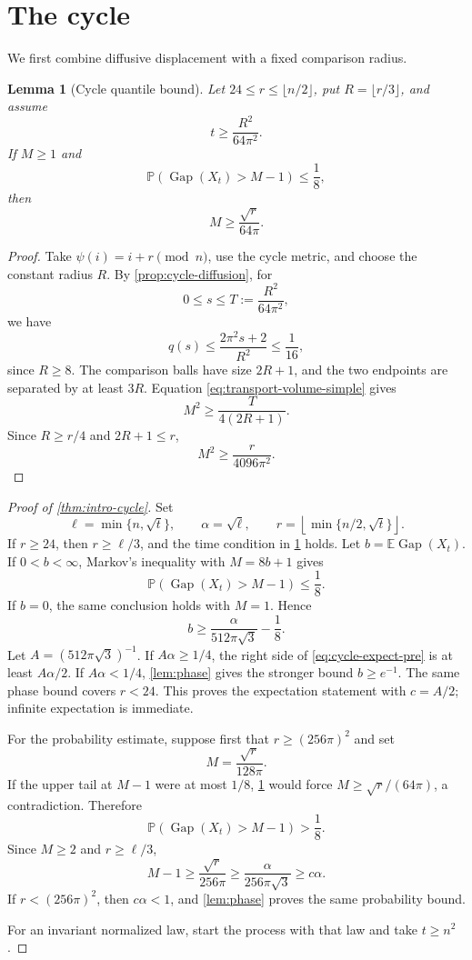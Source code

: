 \documentclass[11pt]{article}
\newtheorem{lemma}[lemma]{Lemma}
\theoremstyle{remark}
\newcommand{\E}{\mathbb{E}}
\newcommand{\Pp}{\mathbb{P}}
\newcommand{\Gap}{\operatorname{Gap}}
\begin{document}
\section{The cycle}\label{sec:cycle}

We first combine diffusive displacement with a fixed comparison radius.

\begin{lemma}[Cycle quantile bound]\label{lem:cycle-quantile}
Let $24\le r\le\lfloor n/2\rfloor$, put $R=\lfloor r/3\rfloor$, and assume
\[
 t\ge\frac{R^2}{64\pi^2}.
\]
If $M\ge1$ and
\[
 \Pp(\Gap(X_t)>M-1)\le\frac18,
\]
then
\[
 M\ge\frac{\sqrt r}{64\pi}.
 \tag{6.1}\label{eq:cycle-quantile}
\]
\end{lemma}

\begin{proof}
Take $\psi(i)=i+r\pmod n$, use the cycle metric, and choose the constant radius $R$. By \cref{prop:cycle-diffusion}, for
\[
 0\le s\le T:=\frac{R^2}{64\pi^2},
\]
we have
\[
 q(s)\le\frac{2\pi^2s+2}{R^2}
 \le\frac1{16},
\]
since $R\ge8$. The comparison balls have size $2R+1$, and the two endpoints are separated by at least $3R$. Equation \eqref{eq:transport-volume-simple} gives
\[
 M^2\ge\frac{T}{4(2R+1)}.
\]
Since $R\ge r/4$ and $2R+1\le r$,
\[
 M^2\ge\frac r{4096\pi^2}.
\]
\end{proof}

\begin{proof}[Proof of \cref{thm:intro-cycle}]
Set
\[
 \ell=\min\{n,\sqrt t\},
 \qquad
 \alpha=\sqrt\ell,
 \qquad
 r=\left\lfloor\min\{n/2,\sqrt t\}\right\rfloor.
\]
If $r\ge24$, then $r\ge\ell/3$, and the time condition in \cref{lem:cycle-quantile} holds. Let $b=\E\Gap(X_t)$. If $0<b<\infty$, Markov's inequality with $M=8b+1$ gives
\[
 \Pp(\Gap(X_t)>M-1)\le\frac18.
\]
If $b=0$, the same conclusion holds with $M=1$.
Hence
\[
 b\ge\frac{\alpha}{512\pi\sqrt3}-\frac18.
 \tag{6.2}\label{eq:cycle-expect-pre}
\]
Let $A=(512\pi\sqrt3)^{-1}$. If $A\alpha\ge1/4$, the right side of \eqref{eq:cycle-expect-pre} is at least $A\alpha/2$. If $A\alpha<1/4$, \cref{lem:phase} gives the stronger bound $b\ge e^{-1}$. The same phase bound covers $r<24$. This proves the expectation statement with $c=A/2$; infinite expectation is immediate.

For the probability estimate, suppose first that $r\ge(256\pi)^2$ and set
\[
 M=\frac{\sqrt r}{128\pi}.
\]
If the upper tail at $M-1$ were at most $1/8$, \cref{lem:cycle-quantile} would force $M\ge\sqrt r/(64\pi)$, a contradiction. Therefore
\[
 \Pp(\Gap(X_t)>M-1)>\frac18.
\]
Since $M\ge2$ and $r\ge\ell/3$,
\[
 M-1\ge\frac{\sqrt r}{256\pi}
 \ge\frac{\alpha}{256\pi\sqrt3}
 \ge c\alpha.
\]
If $r<(256\pi)^2$, then $c\alpha<1$, and \cref{lem:phase} proves the same probability bound.

For an invariant normalized law, start the process with that law and take $t\ge n^2$.
\end{proof}
\end{document}
